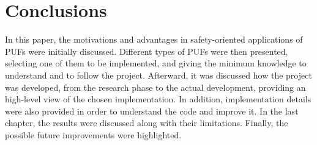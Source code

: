 \chapter{Conclusions}
In this paper, the motivations and advantages in safety-oriented applications of PUFs were initially discussed. Different types of PUFs were then presented, selecting one of them to be implemented, and giving the minimum knowledge to understand and to follow the project.
Afterward, it was discussed how the project was developed, from the research phase to the actual development, providing an high-level view of the chosen implementation.
In addition, implementation details were also provided in order to understand the code and improve it.
In the last chapter, the results were discussed along with their limitations. Finally, the possible future improvements were highlighted.
